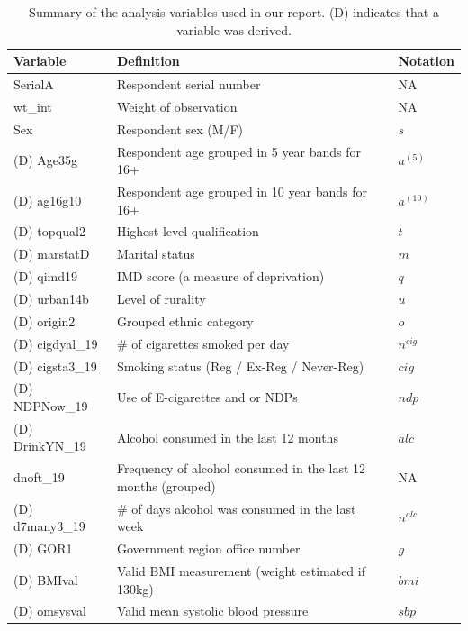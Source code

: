 \documentclass[
  11pt,
  twocolumn]{article}
\begin{document}
\begin{table}

\caption{\label{tab:outputvartable}Summary of the analysis variables used in our report. (D) indicates that a variable was derived.\label{tab:output-var-table}}
\centering
\fontsize{10}{12}\selectfont
\begin{tabular}[t]{>{\raggedright\arraybackslash}p{6em}|>{\raggedright\arraybackslash}p{10em}|l}
\hline
\textbf{Variable} & \textbf{Definition} & \textbf{Notation}\\
\hline
SerialA & Respondent serial number & NA\\
\hline
wt\_int & Weight of observation & NA\\
\hline
Sex & Respondent sex (M/F) & $s$\\
\hline
(D) Age35g & Respondent age grouped in 5 year bands for 16+ & $a^{(5)}$\\
\hline
(D) ag16g10 & Respondent age grouped in 10 year bands for 16+ & $a^{(10)}$\\
\hline
(D) topqual2 & Highest level qualification & $t$\\
\hline
(D) marstatD & Marital status & $m$\\
\hline
(D) qimd19 & IMD score (a measure of deprivation) & $q$\\
\hline
(D) urban14b & Level of rurality & $u$\\
\hline
(D) origin2 & Grouped ethnic category & $o$\\
\hline
(D) cigdyal\_19 & $\#$ of cigarettes smoked per day & $n^{cig}$\\
\hline
(D) cigsta3\_19 & Smoking status (Reg / Ex-Reg / Never-Reg) & $cig$\\
\hline
(D) NDPNow\_19 & Use of E-cigarettes and or NDPs & $ndp$\\
\hline
(D) DrinkYN\_19 & Alcohol consumed in the last 12 months & $alc$\\
\hline
dnoft\_19 & Frequency of alcohol consumed in the last 12 months (grouped) & NA\\
\hline
(D) d7many3\_19 & $\#$ of days alcohol was consumed in the last week & $n^{alc}$\\
\hline
(D) GOR1 & Government region office number & $g$\\
\hline
(D) BMIval & Valid BMI measurement (weight estimated if $\>$ 130kg) & $bmi$\\
\hline
(D) omsysval & Valid mean systolic blood pressure & $sbp$\\
\hline
\end{tabular}
\end{table}
\end{document}
